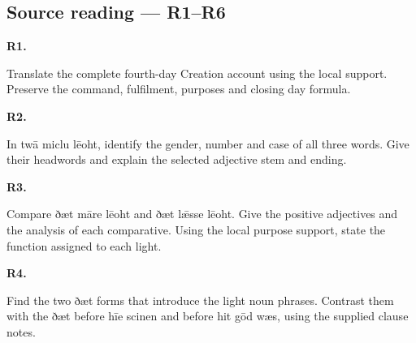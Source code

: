\subsection*{Source reading — R1–R6}

\par\begin{minipage}{\linewidth}\raggedright
\textbf{R1.}

Translate the complete fourth-day Creation account using the local support. Preserve the command, fulfilment, purposes and closing day formula.

\end{minipage}\par\addvspace{4pt}

\par\begin{minipage}{\linewidth}\raggedright
\textbf{R2.}

In twā miclu lēoht, identify the gender, number and case of all three words. Give their headwords and explain the selected adjective stem and ending.

\end{minipage}\par\addvspace{4pt}

\par\begin{minipage}{\linewidth}\raggedright
\textbf{R3.}

Compare ðæt māre lēoht and ðæt lǣsse lēoht. Give the positive adjectives and the analysis of each comparative. Using the local purpose support, state the function assigned to each light.

\end{minipage}\par\addvspace{4pt}

\par\begin{minipage}{\linewidth}\raggedright
\textbf{R4.}

Find the two ðæt forms that introduce the light noun phrases. Contrast them with the ðæt before hīe scinen and before hit gōd wæs, using the supplied clause notes.

\end{minipage}\par\addvspace{4pt}

